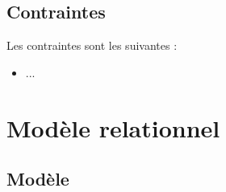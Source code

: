 \documentclass[10pt,a4paper]{article}
\begin{document}
\subsection{Contraintes}
Les contraintes sont les suivantes :
\begin{itemize}
  \item ...
\end{itemize}



\section{Modèle relationnel}
\subsection{Modèle}
\end{document}
